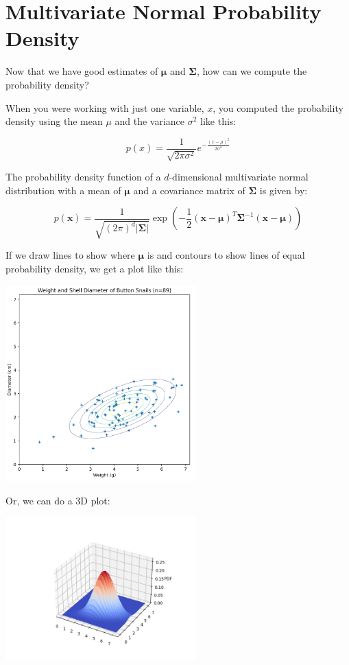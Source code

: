 \section{Multivariate Normal Probability Density}

Now that we have good estimates of $\boldsymbol\mu$ and $\mathbf{\Sigma}$, how can we compute the probability density?

When you were working with just one variable, $x$, you computed the probability density using the mean $\mu$ and the variance $\sigma^2$ like this:

\begin{equation*}
p(x) = \frac{1}{\sqrt{2\pi\sigma^2}} e^{-\frac{(x - \mu)^2}{2\sigma^2}}
\end{equation*}

The probability density function of a $d$-dimensional
multivariate normal distribution with a mean of $\boldsymbol\mu$ and a covariance matrix of $\mathbf{\Sigma}$ is given by:

\begin{equation*}
p(\mathbf{x}) = \frac{1}{\sqrt{(2\pi)^d|\mathbf{\Sigma}|}}\exp\left(-\frac{1}{2}(\mathbf{x}-\boldsymbol\mu)^T\mathbf{\Sigma}^{-1}(\mathbf{x}-\boldsymbol\mu)\right)
\end{equation*}

If we draw lines to show where $\boldsymbol\mu$ is and contours to show lines of equal probability density, we get a plot like this:

\includegraphics[width=0.55\textwidth]{contour.png}

Or, we can do a 3D plot:

\includegraphics[width=0.55\textwidth]{3d.png}

